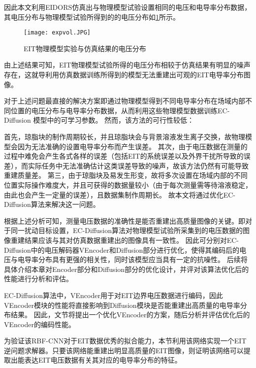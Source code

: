 因此本文利用EIDORS仿真出与物理模型试验设置相同的电压和电导率分布数据，其电压分布与物理模型试验所得到的的电压分布如\cref{figure:expvol}所示。
\begin{figure}[h]
    \centering
    \texttt{[image: expvol.JPG]}
    \caption{EIT物理模型实验与仿真结果的电压分布}
    \label{figure:expvol}
\end{figure}

由上述结果可知，EIT物理模型试验所得的电压分布相较于仿真结果有明显的噪声存在，这就导利用仿真数据训练所得到的模型无法重建出可观的EIT电导率分布图像。

对于上述问题最直接的解决方案即通过物理模型得到不同电导率分布在场域内部不同位置的电压分布与电导率分布数据，从而利用这些物理模型数据训练EC-Diffusion 模型中的可学习参数。
然而，该方法的可行性较低：

首先，琼脂块的制作周期较长，并且琼脂块会与背景溶液发生离子交换，故物理模型会因为无法准确的设置电导率分布而产生误差。
其次，由于电压数据在测量的过程中难免会产生各式各样的误差（包括EIT的系统误差以及外界干扰所导致的误差），而实际任务中无法准确估计这类误差导致的噪声，故该方法仍然有可能导致重建质量差。
第三，由于琼脂块及易发生形变，故将多次设置在场域内部的不同位置实际操作难度大，并且可获得的数据量较小（由于每次测量需等待溶液稳定，由此也会产生一定量的误差），且数据集制作周期长。
故本文将通过优化EC-Diffusion算法来解决这一问题。

根据上述分析可知，测量电压数据的准确性是能否重建出高质量图像的关键。即对于同一扰动目标设置，EC-Diffusion算法对物理模型试验所采集到的电压数据的图像重建结果应该与其对仿真数据重建出的图像具有一致性。
因此可分别对EC-Diffusion中的电压解码器VEncoder和Diffusion部分进行优化，使得其编码后的电压与电导率分布具有更强的相关性，同时该模型应当具有一定的抗噪性。
后续将具体介绍本章对Encoder部分和Diffusion部分的优化设计，并评对该算法优化后的性能进行分析和评估。


EC-Diffusion算法中，VEncoder用于对EIT边界电压数据进行编码，因此VEncoder模块的性能将直接影响到Diffusion模块是否能重建出高质量的电导率分布结果。
因此，文节将提出一个优化VEncoder的方案，随后分析并评估优化后的VEncoder的编码性能。



为验证该RBF-CNN对于EIT数据优秀的拟合能力，本节利用该网络实现一个EIT逆问题求解器。只要该网络能重建出明显高质量的EIT图像，则证明该网络可以提取出能表达EIT电压数据有关其对应的电导率分布的特征。

